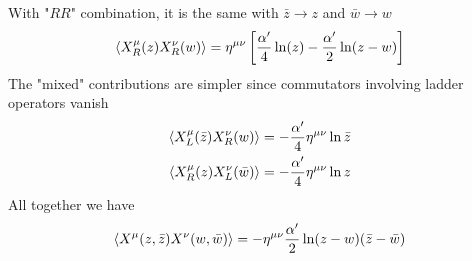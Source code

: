 \begin{enumerate}[label=(\alph*)]
		With "$RR$" combination, it is the same with $\bar{z} \rightarrow z$ and $\bar{w} \rightarrow w$
		\begin{equation}
			\braket{X_R^\mu({z}) X_R^\nu ({w})}	= \eta^{\mu\nu} \left[ \frac{\alpha'}{4} \ln({z}) - \frac{\alpha'}{2} \ln({z}-{w}) \right]
		\end{equation}
		The "mixed" contributions are simpler since commutators involving ladder operators vanish
		\begin{align}
			\braket{X_L^\mu(\bar{z}) X_R^\nu ({w})} &= - \frac{\alpha'}{4} \eta^{\mu\nu} \ln{\bar{z}} \\
			\braket{X_R^\mu({z}) X_L^\nu (\bar{w})} &= - \frac{\alpha'}{4} \eta^{\mu\nu} \ln{{z}}
		\end{align}
		All together we have
		\begin{equation}
			\braket{X^\mu (z,\bar{z}) X^\nu(w,\bar{w})} = -\eta^{\mu\nu} \frac{\alpha'}{2} \ln (z-w)(\bar{z}-\bar{w})
		\end{equation}
\end{enumerate}
